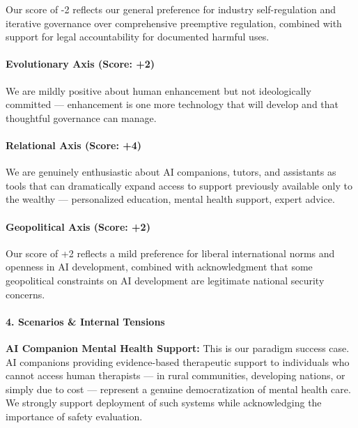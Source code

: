 Our score of -2 reflects our general preference for industry
self-regulation and iterative governance over comprehensive preemptive
regulation, combined with support for legal accountability for
documented harmful uses.

\paragraph{Evolutionary Axis (Score:
+2)}\label{evolutionary-axis-score-2}

We are mildly positive about human enhancement but not ideologically
committed --- enhancement is one more technology that will develop and
that thoughtful governance can manage.

\paragraph{Relational Axis (Score: +4)}\label{relational-axis-score-4}

We are genuinely enthusiastic about AI companions, tutors, and
assistants as tools that can dramatically expand access to support
previously available only to the wealthy --- personalized education,
mental health support, expert advice.

\paragraph{Geopolitical Axis (Score:
+2)}\label{geopolitical-axis-score-2-2}

Our score of +2 reflects a mild preference for liberal international
norms and openness in AI development, combined with acknowledgment that
some geopolitical constraints on AI development are legitimate national
security concerns.

\paragraph{4. Scenarios \& Internal
Tensions}\label{scenarios-internal-tensions-14}

\textbf{AI Companion Mental Health Support:} This is our paradigm
success case. AI companions providing evidence-based therapeutic support
to individuals who cannot access human therapists --- in rural
communities, developing nations, or simply due to cost --- represent a
genuine democratization of mental health care. We strongly support
deployment of such systems while acknowledging the importance of safety
evaluation.

